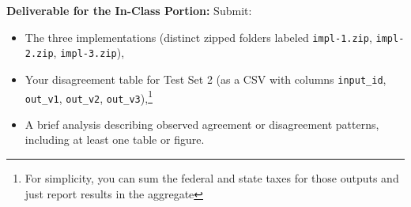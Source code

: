 \begin{tcolorbox}[colback=purple!10,colframe=purple!70!black,boxrule=0.5pt]
\textbf{Deliverable for the In-Class Portion:}
Submit:
\begin{itemize}
  \item The three implementations (distinct zipped folders labeled \texttt{impl-1.zip}, \texttt{impl-2.zip}, \texttt{impl-3.zip}),
  \item Your disagreement table for Test Set 2 (as a CSV with columns \texttt{input\_id}, \texttt{out\_v1}, \texttt{out\_v2}, \texttt{out\_v3}),\footnote{For simplicity, you can sum the federal and state taxes for those outputs and just report results in the aggregate}
  \item A brief analysis describing observed agreement or disagreement patterns, including at least one table or figure.
\end{itemize}
\end{tcolorbox}